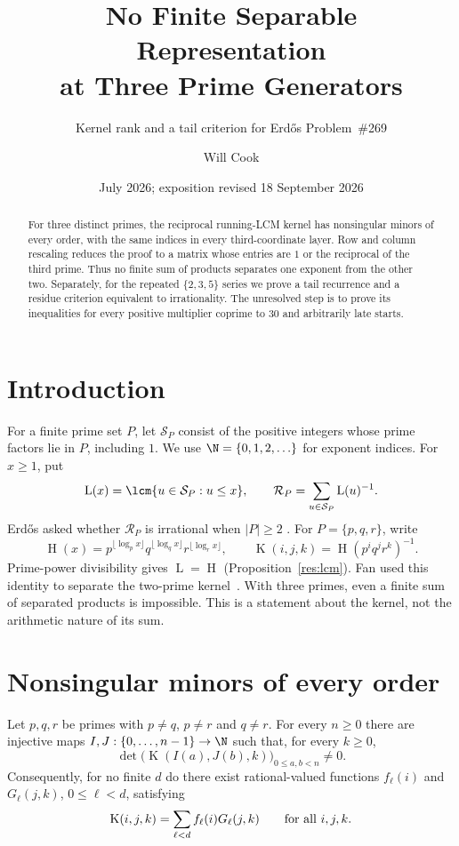 \documentclass[11pt]{article}
\title{No Finite Separable Representation\\at Three Prime Generators}
\subtitle{Kernel rank and a tail criterion for Erd\H{o}s Problem~\#269}
\author{Will Cook}
\date{July 2026; exposition revised 18 September 2026}
\newcommand{\hgt}{\operatorname{H}}
\newcommand{\Lprefix}{\operatorname{L}}
\newcommand{\Kernel}{\operatorname{K}}
\begin{document}
\maketitle
\noteprovenance

\begin{abstract}
For three distinct primes, the reciprocal running-LCM kernel has
nonsingular minors of every order, with the same indices in every
third-coordinate layer.  Row and column rescaling reduces the proof to a
matrix whose entries are $1$ or the reciprocal of the third prime.
Thus no finite sum of products separates one exponent from the other two.
Separately, for the repeated $\{2,3,5\}$ series we prove a tail recurrence
and a residue criterion equivalent to irrationality.  The unresolved
step is to prove its inequalities for every positive multiplier coprime to $30$
and arbitrarily late starts.
\end{abstract}

\section{Introduction}\label{sec:problem}
For a finite prime set $P$, let $\mathcal S_P$ consist of the positive
integers whose prime factors lie in $P$, including $1$.  We use
$\N=\{0,1,2,\ldots\}$ for exponent indices.  For $x\ge1$, put
\[
 \Lprefix(x)=\lcm\{u\in\mathcal S_P:u\le x\},\qquad
 \mathcal R_P=\sum_{u\in\mathcal S_P}\Lprefix(u)^{-1}.
\]
Erd\H{o}s asked whether $\mathcal R_P$ is irrational when $|P|\ge2$
\cite[p.~65]{erdosgraham1980}\cite[p.~106]{erdos1988}.
For $P=\{p,q,r\}$, write
\[
 \hgt(x)=p^{\lfloor\log_p x\rfloor}q^{\lfloor\log_q x\rfloor}
 r^{\lfloor\log_r x\rfloor},\qquad
 \Kernel(i,j,k)=\hgt(p^iq^jr^k)^{-1}.
\]
Prime-power divisibility gives $\Lprefix=\hgt$
(Proposition~\ref{res:lcm}).  Fan used this identity to separate the
two-prime kernel~\cite{fan2026comment}.  With three primes, even a finite
sum of separated products is impossible.  This is a statement about the
kernel, not the arithmetic nature of its sum.

\section{Nonsingular minors of every order}\label{sec:rank}

\begin{theorem}\label{res:infinite-rank}
Let $p,q,r$ be primes with $p\ne q$, $p\ne r$ and $q\ne r$.  For every
$n\ge0$ there are injective maps $I,J:\{0,\ldots,n-1\}\to\N$ such that, for
every $k\ge0$,
\[
 \det\bigl(\Kernel(I(a),J(b),k)\bigr)_{0\le a,b<n}\ne0.
\]
Consequently, for no finite $d$ do there exist rational-valued functions
$f_\ell(i)$ and $G_\ell(j,k)$, $0\le\ell<d$, satisfying
\[
 \Kernel(i,j,k)=\sum_{\ell<d}f_\ell(i)G_\ell(j,k)
 \qquad\hbox{for all }i,j,k.
\]
\end{theorem}
\end{document}

